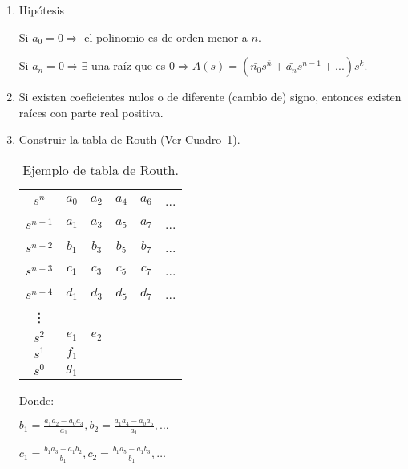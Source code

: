 \documentclass[12pt]{article}
\numberwithin{equation}{subsection}
\begin{document}
\begin{enumerate}
\item
Hipótesis

Si \begin{math}a_0 = 0 \Rightarrow\end{math} el polinomio es de orden menor a \begin{math}n\end{math}.

Si \begin{math}a_n = 0 \Rightarrow \exists\end{math} una raíz que es \begin{math}0 \Rightarrow A(s) = (\bar{n_0} s^{\bar{n}} + \bar{a_n} s^{\bar{n-1}} + ...) s^k \end{math}.

\item
Si existen coeficientes nulos o de diferente (cambio de) signo, entonces existen raíces con parte real positiva.\newpage
\item
Construir la tabla de Routh (Ver Cuadro~\ref{tab:Routh}).

\begin{table}[htbp]
\centering
\begin{tabular}{c|c c c c c}
$s^n$     & $a_0$ & $a_2$ & $a_4$ & $a_6$ & ...\\
$s^{n-1}$ & $a_1$ & $a_3$ & $a_5$ & $a_7$ & ...\\
$s^{n-2}$ & $b_1$ & $b_3$ & $b_5$ & $b_7$ & ...\\
$s^{n-3}$ & $c_1$ & $c_3$ & $c_5$ & $c_7$ & ...\\
$s^{n-4}$ & $d_1$ & $d_3$ & $d_5$ & $d_7$ & ...\\
\vdots                                         \\
$s^2$ & $e_1$ & $e_2$                          \\
$s^1$ & $f_1$                                  \\
$s^0$ & $g_1$
\end{tabular}
\caption{\label{tab:Routh}Ejemplo de tabla de Routh.}
\end{table}

Donde:

\begin{math}
b_1 = \frac{a_1 a_2 - a_0 a_3}{a_1} , b_2 = \frac{a_1 a_4 - a_0 a_5}{a_1} , \dots
\end{math}

\begin{math}
c_1 = \frac{b_1 a_3 - a_1 b_2}{b_1} , c_2 = \frac{b_1 a_5 - a_1 b_3}{b_1} , \dots
\end{math}


\end{enumerate}
\end{document}
